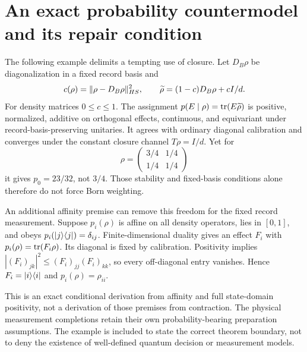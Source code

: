 \section{An exact probability countermodel and its repair condition}\label{section:witness:an-exact-probability-countermodel-and-its-repair-condition}
The following example delimits a tempting use of closure. Let $D_B\rho$ be diagonalization in a fixed record basis and
\[
c(\rho)=\lVert \rho-D_B\rho\rVert_{HS}^2,
\qquad
\widetilde\rho=(1-c)D_B\rho+cI/d.
\]
For density matrices $0\le c\le1$. The assignment $p(E\mid\rho)=\operatorname{tr}(E\widetilde\rho)$ is positive, normalized, additive on orthogonal effects, continuous, and equivariant under record-basis-preserving unitaries. It agrees with ordinary diagonal calibration and converges under the constant closure channel $T\rho=I/d$. Yet for
\[
\rho=\begin{pmatrix}3/4&1/4\\1/4&1/4\end{pmatrix}
\]
it gives $p_0=23/32$, not $3/4$. Those stability and fixed-basis conditions alone therefore do not force Born weighting.

An additional affinity premise can remove this freedom for the fixed record measurement. Suppose $p_i(\rho)$ is affine on all density operators, lies in $[0,1]$, and obeys $p_i(\lvert j\rangle\langle j\rvert)=\delta_{ij}$. Finite-dimensional duality gives an effect $F_i$ with $p_i(\rho)=\operatorname{tr}(F_i\rho)$. Its diagonal is fixed by calibration. Positivity implies $|(F_i)_{jk}|^2\le(F_i)_{jj}(F_i)_{kk}$, so every off-diagonal entry vanishes. Hence $F_i=\lvert i\rangle\langle i\rvert$ and $p_i(\rho)=\rho_{ii}$.

This is an exact conditional derivation from affinity and full state-domain positivity, not a derivation of those premises from contraction. The physical measurement completions retain their own probability-bearing preparation assumptions. The example is included to state the correct theorem boundary, not to deny the existence of well-defined quantum decision or measurement models.

